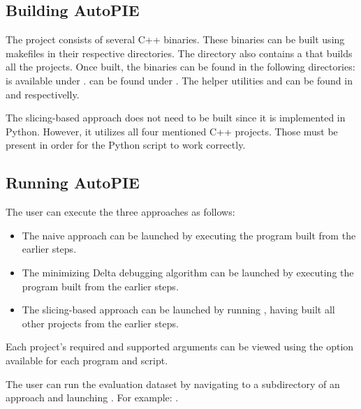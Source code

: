 \documentclass[12pt,a4paper]{report}
\let\openright=\clearpage
\begin{document}
\subsection{Building AutoPIE}

The project consists of several C++ binaries. 
These binaries can be built using makefiles in their respective directories. 
The  directory also contains a  that builds 
all the projects. 
Once built, the binaries can be found in the following directories:
 is available under 
.
 can be found under 
.
The helper utilities  and  can 
be found in 
and  
respectivelly.

The slicing-based approach does not need to be built since it is implemented 
in Python. 
However, it utilizes all four mentioned C++ projects. 
Those must be present in order for the Python script to work correctly.

\subsection{Running AutoPIE}

The user can execute the three approaches as follows:

\begin{itemize}
  \item The naive approach can be launched by executing 
  the  program built from the earlier steps.
  \item The minimizing Delta debugging algorithm can be launched by 
  executing the  program built from the earlier steps.
  \item The slicing-based approach can be launched by running 
  , having built 
  all other projects from the earlier steps.
\end{itemize}

Each project's required and supported arguments can be viewed using 
the  option available for each program and script.

The user can run the evaluation dataset by navigating to a subdirectory of 
an approach and launching . 
For example: .

\openright
\end{document}
